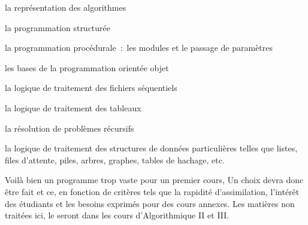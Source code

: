 	\begin{liste}
	\item 
		la représentation des algorithmes
	\item
		la programmation structurée
	\item
		la programmation procédurale~:~les modules et 
		le passage de paramètres
	\item
		les bases de la programmation orientée objet
	\item
		la logique de traitement des fichiers séquentiels
	\item
		la logique de traitement des tableaux
	\item
		la résolution de problèmes récursifs
	\item
		la logique de traitement des structures de données particulières telles
		que listes, files d’attente, piles, arbres, graphes, tables de hachage,
		etc.
	\end{liste}

	Voilà bien un programme trop vaste pour un premier cours, 
	Un choix devra donc être fait et ce, en fonction
	de critères tels que la rapidité d’assimilation, l’intérêt des
	étudiants et les besoins exprimés pour des cours annexes. 
	Les matières non traitées ici, 
	le seront dans les cours d'Algorithmique II et III. 

	

